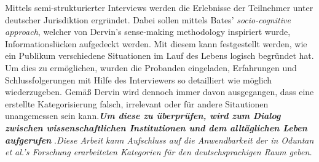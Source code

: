 


Mittels semi-strukturierter Interviews werden die Erlebnisse der Teilnehmer unter deutscher Jurisdiktion ergr\"undet. Dabei sollen mittels Bates' \textit{socio-cognitive approach}\cite{bates2005introduction}, welcher von Dervin's sense-making methodology\cite{dervin2003sense} inspiriert wurde, Informationsl\"ucken aufgedeckt werden.\newline
Mit diesem kann festgestellt werden, wie ein Publikum verschiedene Situationen im Lauf des Lebens logisch begr\"undet hat. Um dies zu erm\"oglichen, wurden die Probanden eingeladen, Erfahrungen und Schlussfolgerungen mit Hilfe des Interviewers so detailliert wie m\"oglich wiederzugeben.\newline
Gem\"a\ss{} Dervin wird dennoch immer davon ausgegangen, dass eine erstellte Kategorisierung falsch, irrelevant oder f\"ur andere Sitautionen unangemessen sein kann.\textit{\textbf{Um diese zu \"uberpr\"ufen, wird zum Dialog zwischen wissenschaftlichen Institutionen und dem allt\"aglichen Leben aufgerufen}} .\textit{Diese Arbeit kann Aufschluss auf die Anwendbarkeit der in Oduntan et al.'s Forschung erarbeiteten Kategorien f\"ur den deutschsprachigen Raum geben.}\newline


